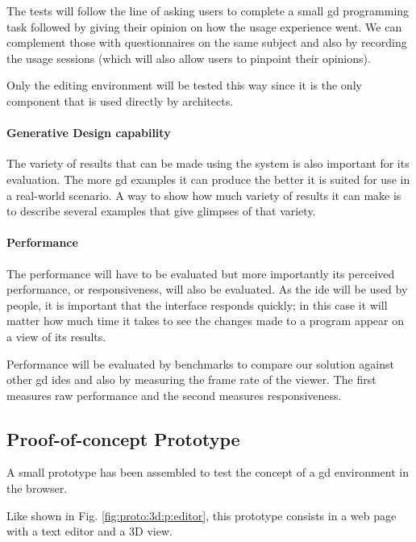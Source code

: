 \documentclass{./llncs2e/llncs}
\begin{document}
	The tests will follow the line of asking users to complete a small \ac{gd} programming task followed by giving their opinion on how the usage experience went.
	We can complement those with questionnaires on the same subject and also by recording the usage sessions (which will also allow users to pinpoint their opinions).
	
	Only the editing environment will be tested this way since it is the only component that is used directly by architects.
	
	\paragraph{Generative Design capability}
	The variety of results that can be made using the system is also important for its evaluation.
	The more \ac{gd} examples it can produce the better it is suited for use in a real-world scenario.
	A way to show how much variety of results it can make is to describe several examples that give glimpses of that variety.
	
	\paragraph{Performance}
	The performance will have to be evaluated but more importantly its perceived performance, or responsiveness, will also be evaluated.
	As the \ac{ide} will be used by people, it is important that the interface responds quickly;
	in this case it will matter how much time it takes to see the changes made to a program appear on a view of its results.
	
	Performance will be evaluated by benchmarks to compare our solution against other \ac{gd} \ac{ide}s and also by measuring the frame rate of the viewer.
	The first measures raw performance and the second measures responsiveness.

\subsection{Proof-of-concept Prototype}
	A small prototype has been assembled to test the concept of a \ac{gd} environment in the browser.

	Like shown in Fig. \ref{fig:proto:3d:p:editor}, this prototype consists in a web page with a text editor and a 3D view.
\end{document}
